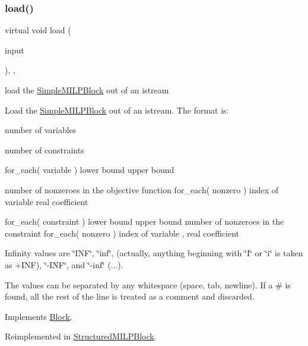 \subsubsection{\texorpdfstring{load()}{load()}}
{\footnotesize\ttfamily virtual void load (\begin{DoxyParamCaption}\item[{std\+::istream \&}]{input }\end{DoxyParamCaption})\hspace{0.3cm}{\ttfamily [override]}, {\ttfamily [protected]}, {\ttfamily [virtual]}}



load the \mbox{\hyperlink{class_s_m_spp__di__unipi__it_1_1_simple_m_i_l_p_block}{Simple\+M\+I\+L\+P\+Block}} out of an istream 

Load the \mbox{\hyperlink{class_s_m_spp__di__unipi__it_1_1_simple_m_i_l_p_block}{Simple\+M\+I\+L\+P\+Block}} out of an istream. The format is\+:

number of variables

number of constraints

for\+\_\+each( variable ) lower bound upper bound

number of nonzeroes in the objective function for\+\_\+each( nonzero ) index of variable real coefficient

for\+\_\+each( constraint ) lower bound upper bound number of nonzeroes in the constraint for\+\_\+each( nonzero ) index of variable , real coefficient

Infinity values are \char`\"{}\+I\+N\+F\char`\"{}, \char`\"{}inf\char`\"{}, (actually, anything beginning with \char`\"{}\+I\char`\"{} or \char`\"{}i\char`\"{} is taken as +\+I\+NF), \char`\"{}-\/\+I\+N\+F\char`\"{}, and \char`\"{}-\/inf\char`\"{} (...).

The values can be separated by any whitespace (space, tab, newline). If a \textquotesingle{}\#\textquotesingle{} is found, all the rest of the line is treated as a comment and discarded. 

Implements \mbox{\hyperlink{class_s_m_spp__di__unipi__it_1_1_block_a27ae9e4279482d52342c7958c34a43c6}{Block}}.



Reimplemented in \mbox{\hyperlink{class_s_m_spp__di__unipi__it_1_1_structured_m_i_l_p_block_a019850055afe817b816bae5699f461d3}{Structured\+M\+I\+L\+P\+Block}}.

\mbox{\label{class_s_m_spp__di__unipi__it_1_1_simple_m_i_l_p_block_aefb3f33afdab2b6f4aef3f926c10df51}} 
